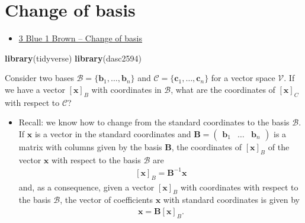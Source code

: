 \documentclass[
]{book}
\newenvironment{Shaded}{\begin{snugshade}}{\end{snugshade}}
\newcommand{\KeywordTok}[1]{\textcolor[rgb]{0.13,0.29,0.53}{\textbf{#1}}}
\newcommand{\NormalTok}[1]{#1}
\providecommand{\tightlist}{%
  \setlength{\itemsep}{0pt}\setlength{\parskip}{0pt}}
\theoremstyle{definition}
\theoremstyle{definition}
\theoremstyle{definition}
\theoremstyle{definition}
\theoremstyle{remark}
\begin{document}
\hypertarget{change-of-basis}{%
\chapter{Change of basis}\label{change-of-basis}}

\begin{itemize}
\tightlist
\item
  \href{https://www.3blue1brown.com/lessons/change-of-basis}{3 Blue 1 Brown -- Change of basis}
\end{itemize}

\begin{Shaded}
\begin{Highlighting}[]
\KeywordTok{library}\NormalTok{(tidyverse)}
\KeywordTok{library}\NormalTok{(dasc2594)}
\end{Highlighting}
\end{Shaded}

Consider two bases \(\mathcal{B} = \{ \mathbf{b}_1, \ldots, \mathbf{b}_n \}\) and \(\mathcal{C} = \{ \mathbf{c}_1, \ldots, \mathbf{c}_n \}\) for a vector space \(\mathcal{V}\). If we have a vector \(\left[\mathbf{x}\right]_B\) with coordinates in \(\mathcal{B}\), what are the coordinates of \(\left[\mathbf{x}\right]_C\) with respect to \(\mathcal{C}\)?

\begin{itemize}
\tightlist
\item
  Recall: we know how to change from the standard coordinates to the basis \(\mathcal{B}\). If \(\mathbf{x}\) is a vector in the standard coordinates and \(\mathbf{B} = \begin{pmatrix} \mathbf{b}_1 & \ldots & \mathbf{b}_n \end{pmatrix}\) is a matrix with columns given by the basis \(\mathbf{B}\), the coordinates of \(\left[\mathbf{x}\right]_B\) of the vector \(\mathbf{x}\) with respect to the basis \(\mathcal{B}\) are
  \[
  \begin{aligned}
  \left[\mathbf{x}\right]_B = \mathbf{B}^{-1} \mathbf{x}
  \end{aligned}
  \]
  and, as a consequence, given a vector \(\left[\mathbf{x}\right]_B\) with coordinates with respect to the basis \(\mathcal{B}\), the vector of coefficients \(\mathbf{x}\) with standard coordinates is given by
  \[
  \begin{aligned}
  \mathbf{x} = \mathbf{B} \left[\mathbf{x}\right]_B.
  \end{aligned}
  \]
\end{itemize}
\end{document}
